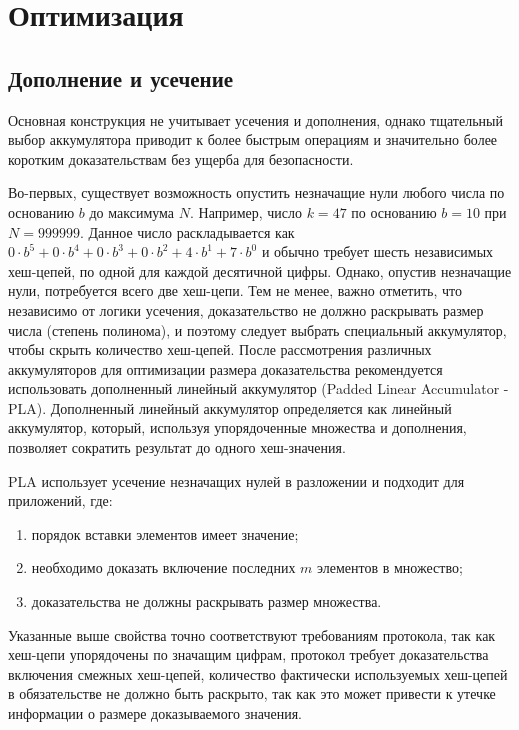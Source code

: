 \section{Оптимизация}
\subsection{Дополнение и усечение}
Основная конструкция не учитывает усечения и дополнения, однако тщательный выбор аккумулятора приводит к более быстрым операциям и значительно более коротким доказательствам без ущерба для безопасности.

Во-первых, существует возможность опустить незначащие нули любого числа по основанию $b$ до максимума $N$.
Например, число $k = 47$ по основанию $b = 10$ при $N = 999999$.
Данное число раскладывается как $0 \cdot b^5 + 0 \cdot b^4 + 0 \cdot b^3 + 0 \cdot b^2 + 4 \cdot b^1 + 7 \cdot b^0$ и обычно требует шесть независимых хеш-цепей, по одной для каждой десятичной цифры.
Однако, опустив незначащие нули, потребуется всего две хеш-цепи.
Тем не менее, важно отметить, что независимо от логики усечения, доказательство не должно раскрывать размер числа (степень полинома), и поэтому следует выбрать специальный аккумулятор, чтобы скрыть количество хеш-цепей. После рассмотрения различных аккумуляторов для оптимизации размера доказательства рекомендуется использовать дополненный линейный аккумулятор (Padded Linear Accumulator - PLA).
Дополненный линейный аккумулятор определяется как линейный аккумулятор, который, используя упорядоченные множества и дополнения, позволяет сократить результат до одного хеш-значения.

PLA использует усечение незначащих нулей в разложении и подходит для приложений, где:
\begin{enumerate}
	\item порядок вставки элементов имеет значение;
	\item необходимо доказать включение последних $m$ элементов в множество;
	\item доказательства не должны раскрывать размер множества.
\end{enumerate}
Указанные выше свойства точно соответствуют требованиям протокола, так как хеш-цепи упорядочены по значащим цифрам, протокол требует доказательства включения смежных хеш-цепей, количество фактически используемых хеш-цепей в обязательстве не должно быть раскрыто, так как это может привести к утечке информации о размере доказываемого значения.

